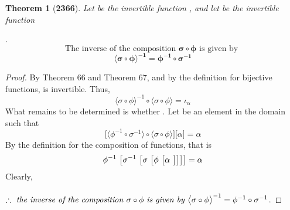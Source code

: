 \documentclass[preview]{standalone}
\newtheorem{theorem}{Theorem}
\begin{document}
\begin{theorem}[\textbf{2366}]
    Let \bm{$\sigma$} be the invertible function 
    \bm{$\sigma : \Theta \rightarrow \Omega$}, 
    and let \bm{$\phi$} be the invertible function 
    \raggedright \bm{$\phi : \Phi \rightarrow \Theta$}. 
    \begin{equation*}
        \text{The inverse of the composition }
        \bm{\sigma \circ \phi}
        \text{ is given by }
    \end{equation*}
    \begin{equation*}
        \bm{
            \big \langle \sigma \circ \phi \big \rangle ^{-1} 
                = \phi ^{-1} \circ \sigma ^{-1}
            }
    \end{equation*}
\end{theorem}

\begin{proof}
    By Theorem 66 and Theorem 67, and by the definition for bijective functions, 
    \bm{$\sigma \circ \phi$} is invertible. 
    Thus, 
    \begin{equation*}
        \big \langle \sigma \circ \phi \big \rangle ^{-1} 
            \circ 
        \big \langle \sigma \circ \phi \big \rangle 
            = 
        \iota_{\alpha}
    \end{equation*}
    What remains to be determined is whether 
    . 
    Let \bm{$\alpha$} be an element in the domain \bm{$\Phi$} such that 
    \begin{equation*}
        \big[
            \big \langle \phi ^{-1} \circ \sigma ^{-1} \big \rangle 
                \circ 
            \big \langle \sigma \circ \phi \big \rangle
        \big] 
            \big[ \alpha \big] 
            = 
        \alpha
    \end{equation*}
    By the definition for the composition of functions, 
    that is 
    \begin{equation*}
        \phi ^{-1} \text{\space} \big[ 
            \sigma ^{-1} \text{\space} \big[ 
                \sigma \text{\space} \big[ 
                    \phi \text{\space} \big[
                        \alpha \text{\space}
                    \big]
                \big]
            \big]
        \big]
             = 
        \alpha
    \end{equation*}
    Clearly, 
    \\ \\
    $\therefore \text{ \emph{the inverse of the composition} } \relax{
        \sigma \circ \phi 
        \text{ \emph{is given by} }
        \big \langle \sigma \circ \phi \big \rangle ^{-1} 
            = 
        \phi^{-1} \circ \sigma^{-1}
    }$.
\end{proof}
\end{document}
